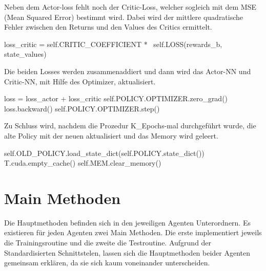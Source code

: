 Neben dem Actor-loss fehlt noch der Critic-Loss, welcher sogleich mit dem MSE (Mean Squared Error) bestimmt wird. Dabei wird der mittlere quadratische Fehler zwischen den Returns und den Values des Critics ermittelt.
\begin{python}
	loss_critic = self.CRITIC_COEFFICIENT * \
					      self.LOSS(rewards_b, state_values)
\end{python}
Die beiden Losses werden zusammenaddiert und dann wird das Actor-NN und Critic-NN, mit Hilfe des Optimizer, aktualisiert.
\begin{python}
	loss = loss_actor + loss_critic 
	self.POLICY.OPTIMIZER.zero_grad()
	loss.backward()
	self.POLICY.OPTIMIZER.step()
\end{python}
Zu Schluss wird, nachdem die Prozedur K\_Epochs-mal durchgeführt wurde, die alte Policy mit der neuen aktualisiert und das Memory wird geleert.
\begin{python}
	self.OLD_POLICY.load_state_dict(self.POLICY.state_dict())
	T.cuda.empty_cache()
	self.MEM.clear_memory()
\end{python}

\section{Main Methoden}
Die Hauptmethoden befinden sich in den jeweiligen Agenten Unterordnern. Es existieren für jeden Agenten zwei Main Methoden. Die erste implementiert jeweils die Trainingsroutine und die zweite die Testroutine. Aufgrund der Standardisierten Schnittstelen, lassen sich die Hauptmethoden beider Agenten gemeinsam erklären, da sie sich kaum voneinander unterscheiden.

